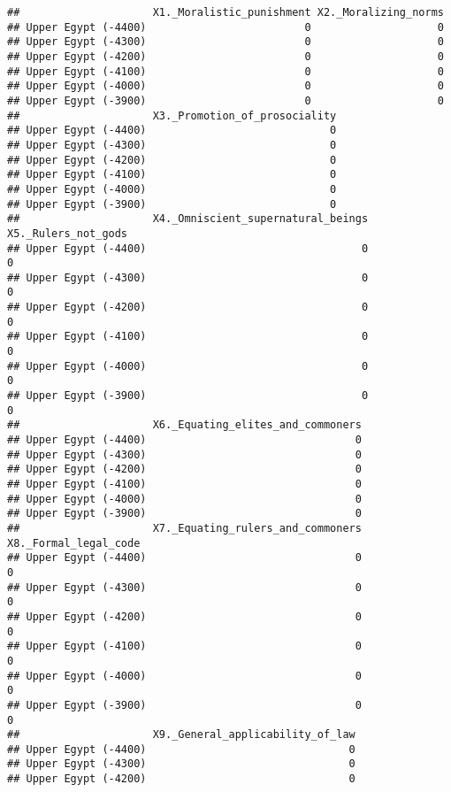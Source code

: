 \documentclass[
]{article}
\begin{document}
\begin{verbatim}
##                     X1._Moralistic_punishment X2._Moralizing_norms
## Upper Egypt (-4400)                         0                    0
## Upper Egypt (-4300)                         0                    0
## Upper Egypt (-4200)                         0                    0
## Upper Egypt (-4100)                         0                    0
## Upper Egypt (-4000)                         0                    0
## Upper Egypt (-3900)                         0                    0
##                     X3._Promotion_of_prosociality
## Upper Egypt (-4400)                             0
## Upper Egypt (-4300)                             0
## Upper Egypt (-4200)                             0
## Upper Egypt (-4100)                             0
## Upper Egypt (-4000)                             0
## Upper Egypt (-3900)                             0
##                     X4._Omniscient_supernatural_beings X5._Rulers_not_gods
## Upper Egypt (-4400)                                  0                   0
## Upper Egypt (-4300)                                  0                   0
## Upper Egypt (-4200)                                  0                   0
## Upper Egypt (-4100)                                  0                   0
## Upper Egypt (-4000)                                  0                   0
## Upper Egypt (-3900)                                  0                   0
##                     X6._Equating_elites_and_commoners
## Upper Egypt (-4400)                                 0
## Upper Egypt (-4300)                                 0
## Upper Egypt (-4200)                                 0
## Upper Egypt (-4100)                                 0
## Upper Egypt (-4000)                                 0
## Upper Egypt (-3900)                                 0
##                     X7._Equating_rulers_and_commoners X8._Formal_legal_code
## Upper Egypt (-4400)                                 0                     0
## Upper Egypt (-4300)                                 0                     0
## Upper Egypt (-4200)                                 0                     0
## Upper Egypt (-4100)                                 0                     0
## Upper Egypt (-4000)                                 0                     0
## Upper Egypt (-3900)                                 0                     0
##                     X9._General_applicability_of_law
## Upper Egypt (-4400)                                0
## Upper Egypt (-4300)                                0
## Upper Egypt (-4200)                                0

\end{verbatim}
\end{document}
